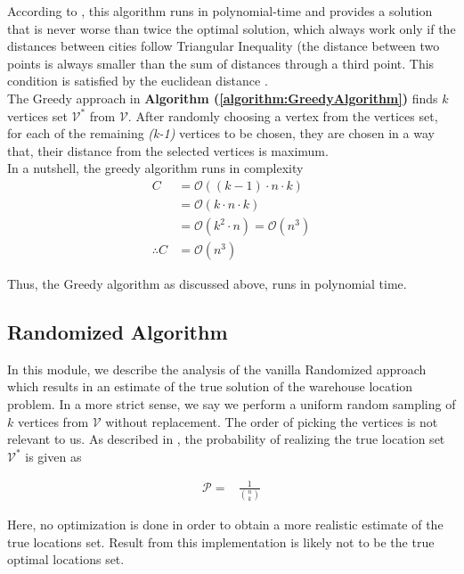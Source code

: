 \documentclass[longpaper, english, final, times]{revdetua}
\begin{document}
			According to \cite{kcenterProblem}, this algorithm runs in polynomial-time and provides a solution that is never worse than twice the optimal solution, which always work only if the distances between cities follow Triangular Inequality (the distance between two points is always smaller than the sum of distances through a third point. This condition is satisfied by the euclidean distance \cite{greenhoe2016properties}.\\
			
			The Greedy approach in \textbf{Algorithm (\ref{algorithm:GreedyAlgorithm})} finds $k$ vertices set $\mathcal{V^{*}}$ from $\mathcal{V}$. After randomly choosing a vertex from the vertices set, for each of the remaining \emph{(k-1)} vertices to be chosen, they are chosen in a way that, their distance from the selected vertices is maximum. \\
			
			In a nutshell, the greedy algorithm runs in complexity
			\begin{align*}
				C &= \mathcal{O}\left((k-1)\cdot n \cdot k\right) \\
				&= \mathcal{O}\left(k\cdot n \cdot k \right) \\
				&= \mathcal{O}\left(k^2\cdot n \right) = \mathcal{O}\left(n^3 \right) \\
				\therefore C &= \mathcal{O}\left(n^3 \right)
			\end{align*}
			
			Thus, the Greedy algorithm as discussed above, runs in polynomial time.
			
		\subsection{Randomized Algorithm}
			In this module, we describe the analysis of the vanilla Randomized approach which results in an estimate of the true solution of the warehouse location problem. In a more strict sense, we say we perform a uniform random sampling of $k$ vertices from $\mathcal{V}$ without replacement. The order of picking the vertices is not relevant to us. As described in \cite{horvitz1952generalization}, the probability of realizing the true location set $\mathcal{V^{*}}$ is given as
			
			\begin{align*}
				\mathcal{P}=&\frac{1}{{n\choose k}}
			\end{align*}
		
			Here, no optimization is done in order to obtain a more realistic estimate of the true locations set. Result from this implementation is likely not to be the true optimal locations set.
			
\end{document}

